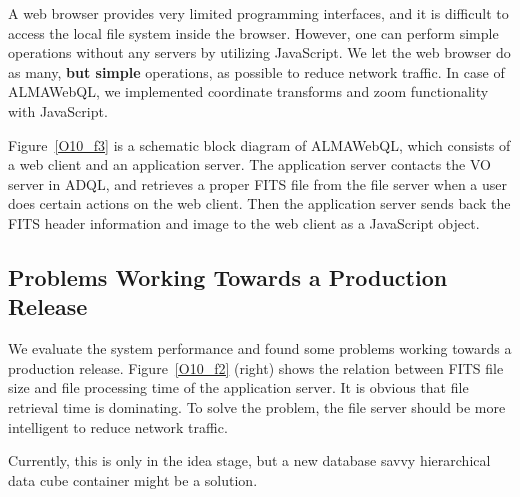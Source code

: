 A web browser provides very limited programming interfaces, and it is difficult to access the local file system inside the browser. However, one can perform simple operations without any servers by utilizing  JavaScript. We let the web browser do as many, {\bf but simple} operations, as possible to reduce network traffic. In case of ALMAWebQL, we implemented coordinate transforms and zoom functionality with JavaScript.

Figure~\ref{O10_f3} is a schematic block diagram of ALMAWebQL, which consists of a web client and an application server. The application server contacts the VO server in ADQL, and retrieves a proper FITS file from the file server when a user does certain actions on the web client. Then the application server sends back the FITS header information and image to the web client as a JavaScript object.

\subsection{Problems Working Towards a Production Release}

We evaluate the system performance and found some problems working towards a production release. Figure~\ref{O10_f2} (right) shows the relation between FITS file size and file processing time of the application server. It is obvious that file retrieval time is dominating. To solve the problem, the file server should be more intelligent to reduce network traffic.

Currently, this is only in the idea stage, but a new database savvy hierarchical data cube container might be a solution.


